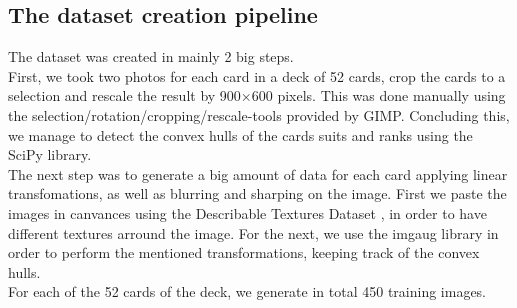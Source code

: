 \documentclass[a0,landscape]{a0poster}
\begin{document}
\begin{multicols}{3}
\subsection*{The dataset creation pipeline}
The dataset was created in mainly 2 big steps. \\
First, we took two photos for each card in a deck of 52 cards, crop the cards to a selection and rescale the result by 900$\times$600 pixels.
This was done manually using  the selection/rotation/cropping/rescale-tools provided by GIMP.  Concluding this, we manage to detect the convex hulls of the
cards suits and ranks using the SciPy library.  \\
The next step was to generate a big amount of data for each card applying linear transfomations, as well as blurring and sharping on the image.
First we paste the images in canvances using the Describable Textures Dataset \cite{cimpoi14describing}, in order to have different textures arround the image.
For the next, we use the imgaug library in order to perform the mentioned transformations, keeping track of the convex hulls. \\
For each of the 52 cards of the deck, we generate in total 450 training images. 






\end{multicols}
\end{document}
